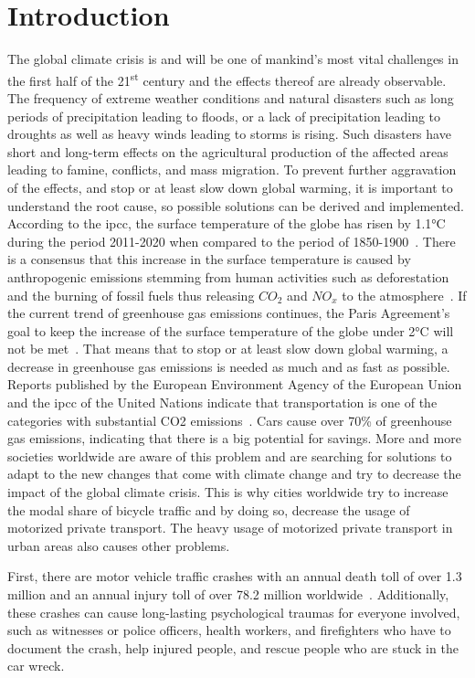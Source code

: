 \cleardoublepage
\chapter{Introduction}
\label{cha:introduction}
The global climate crisis is and will be one of mankind's most vital challenges in the first half of the 21\textsuperscript{st} century and the effects thereof are already observable.
The frequency of extreme weather conditions and natural disasters such as long periods of precipitation leading to floods, or a lack of precipitation leading to droughts as well as heavy winds leading to storms is rising.
Such disasters have short and long-term effects on the agricultural production of the affected areas leading to famine, conflicts, and mass migration.
To prevent further aggravation of the effects, and stop or at least slow down global warming, it is important to understand the root cause, so possible solutions can be derived and implemented. 
According to the \ac{ipcc}, the surface temperature of the globe has risen by 1.1°C during the period 2011-2020 when compared to the period of 1850-1900~\cite{lee2023climate}.
There is a consensus that this increase in the surface temperature is caused by anthropogenic emissions stemming from human activities such as deforestation and the burning of fossil fuels thus releasing $CO_{2}$ and $NO_{x}$ to the atmosphere~\cite{archer2010climate}.
If the current trend of greenhouse gas emissions continues, the Paris Agreement's~\cite{un2015paris} goal to keep the increase of the surface temperature of the globe under 2°C will not be met~\cite{noah2023data}.
That means that to stop or at least slow down global warming, a decrease in greenhouse gas emissions is needed as much and as fast as possible.
Reports published by the European Environment Agency of the European Union and the \ac{ipcc} of the United Nations indicate that transportation is one of the categories with substantial CO2 emissions~\cite{lee2023climate2}.
Cars cause over 70\% of greenhouse gas emissions, indicating that there is a big potential for savings.
More and more societies worldwide are aware of this problem and are searching for solutions to adapt to the new changes that come with climate change and try to decrease the impact of the global climate crisis.
This is why cities worldwide try to increase the modal share of bicycle traffic and by doing so, decrease the usage of motorized private transport.
The heavy usage of motorized private transport in urban areas also causes other problems.

First, there are motor vehicle traffic crashes with an annual death toll of over 1.3 million and an annual injury toll of over 78.2 million worldwide~\cite{bhalla2014transport}.
Additionally, these crashes can cause long-lasting psychological traumas for everyone involved, such as witnesses or police officers, health workers, and firefighters who have to document the crash, help injured people, and rescue people who are stuck in the car wreck.


